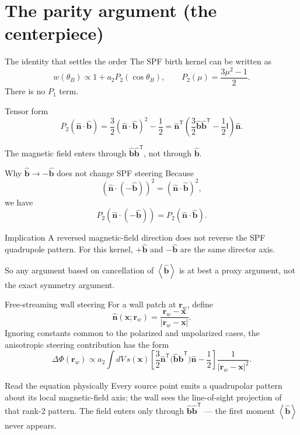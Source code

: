 \documentclass[aspectratio=169]{beamer}
\newcommand{\bn}{\hat{\bm n}}
\newcommand{\bb}{\hat{\bm b}}
\newcommand{\bx}{\bm x}
\newcommand{\brw}{\bm r_w}
\newcommand{\I}{\mathsf I}
\newcommand{\T}{\mathsf T}
\newcommand{\avg}[1]{\left\langle #1 \right\rangle}
\newcommand{\Ptwo}{P_2}
\newcommand{\Pone}{P_1}
\begin{document}
\section{The parity argument (the centerpiece)}

\begin{frame}[t]{The identity that settles the order}
The SPF birth kernel can be written as
\[
w(\theta_B) \propto 1+a_2\Ptwo(\cos\theta_B),
\qquad
\Ptwo(\mu)=\frac{3\mu^2-1}{2}.
\]
There is no $\Pone$ term.
\vspace{0.8em}
\begin{block}{Tensor form}
\[
\Ptwo(\bn\cdot\bb)
=\frac{3}{2}(\bn\cdot\bb)^2-\frac{1}{2}
=\bn^\T\left(\frac{3}{2}\bb\bb^\T-\frac{1}{2}\I\right)\bn .
\]
\end{block}
The magnetic field enters through $\bb\bb^\T$, not through $\bb$.
\end{frame}

\begin{frame}[t]{Why $\bb\rightarrow -\bb$ does not change SPF steering}
Because
\[
(\bn\cdot(-\bb))^2=(\bn\cdot\bb)^2,
\]
we have
\[
\Ptwo(\bn\cdot(-\bb))=\Ptwo(\bn\cdot\bb).
\]
\begin{block}{Implication}
A reversed magnetic-field direction does not reverse the SPF quadrupole pattern. For this kernel, $+\bb$ and $-\bb$ are the same director axis.
\end{block}
So any argument based on cancellation of $\avg{\bb}$ is at best a proxy argument, not the exact symmetry argument.
\end{frame}

\begin{frame}[t]{Free-streaming wall steering}
For a wall patch at $\brw$, define
\[
\bn(\bx;\brw)=\frac{\brw-\bx}{|\brw-\bx|}.
\]
Ignoring constants common to the polarized and unpolarized cases, the anisotropic steering contribution has the form
\[
\Delta\Phi(\brw)\propto
 a_2\int dV\,s(\bx)
 \left[\frac{3}{2}\bn^\T\bigl(\bb\bb^\T\bigr)\bn-\frac{1}{2}\right]
 \frac{1}{|\brw-\bx|^2}.
\]
\begin{block}{Read the equation physically}
Every source point emits a quadrupolar pattern about its local magnetic-field axis; the wall sees the line-of-sight projection of that rank-2 pattern. The field enters only through $\bb\bb^\T$ --- the first moment $\avg{\bb}$ never appears.
\end{block}
\end{frame}
\end{document}
